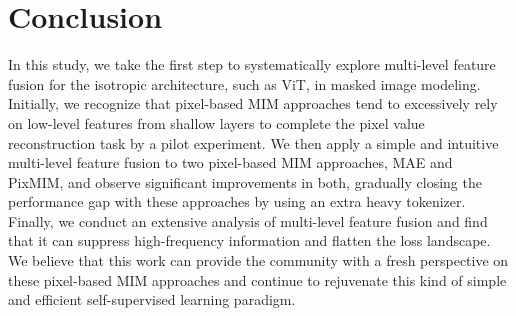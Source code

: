 \section{Conclusion}
In this study, we take the first step to systematically explore multi-level feature fusion for the isotropic architecture, such as ViT, in masked image modeling. Initially, we recognize that pixel-based MIM approaches tend to excessively rely on low-level features from shallow layers to complete the pixel value reconstruction task by a pilot experiment. We then apply a simple and intuitive multi-level feature fusion to two pixel-based MIM approaches, MAE and PixMIM, and observe significant improvements in both, gradually closing the performance gap with these approaches by using an extra heavy tokenizer. Finally, we conduct an extensive analysis of multi-level feature fusion and find that it can suppress high-frequency information and flatten the loss landscape. We believe that this work can provide the community with a fresh perspective on these pixel-based MIM approaches and continue to rejuvenate this kind of simple and efficient self-supervised learning paradigm.